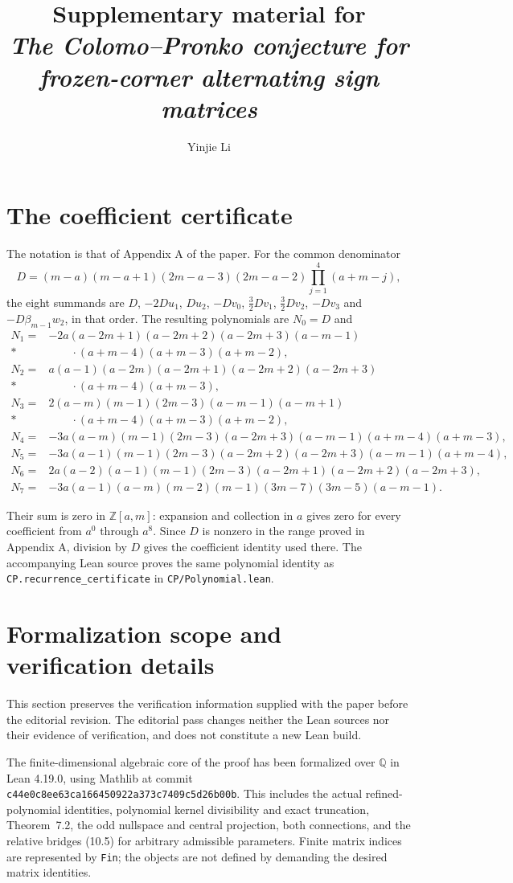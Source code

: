 \documentclass[11pt,a4paper]{article}
\title{Supplementary material for\\\emph{The Colomo--Pronko conjecture for frozen-corner alternating sign matrices}}
\author{Yinjie Li}
\date{}
\newcommand{\Q}{\mathbb Q}
\begin{document}
\maketitle
\section{The coefficient certificate}
The notation is that of Appendix A of the paper. For the common denominator
\[
 D=(m-a)(m-a+1)(2m-a-3)(2m-a-2)\prod_{j=1}^4(a+m-j),
\]
the eight summands are $D$, $-2Du_1$, $Du_2$, $-Dv_0$, $\tfrac32Dv_1$, $\tfrac32Dv_2$, $-Dv_3$ and $-D\beta_{m-1}w_2$, in that order.
The resulting polynomials are $N_0=D$ and
\begin{align*}
 N_1={}&-2a(a-2m+1)(a-2m+2)(a-2m+3)(a-m-1)\\*
 &\qquad\cdot(a+m-4)(a+m-3)(a+m-2),\\
 N_2={}&a(a-1)(a-2m)(a-2m+1)(a-2m+2)(a-2m+3)\\*
 &\qquad\cdot(a+m-4)(a+m-3),\\
 N_3={}&2(a-m)(m-1)(2m-3)(a-m-1)(a-m+1)\\*
 &\qquad\cdot(a+m-4)(a+m-3)(a+m-2),\\
 N_4={}&-3a(a-m)(m-1)(2m-3)(a-2m+3)(a-m-1)(a+m-4)(a+m-3),\\
 N_5={}&-3a(a-1)(m-1)(2m-3)(a-2m+2)(a-2m+3)(a-m-1)(a+m-4),\\
 N_6={}&2a(a-2)(a-1)(m-1)(2m-3)(a-2m+1)(a-2m+2)(a-2m+3),\\
 N_7={}&-3a(a-1)(a-m)(m-2)(m-1)(3m-7)(3m-5)(a-m-1).
\end{align*}

Their sum is zero in $\mathbb Z[a,m]$: expansion and collection in $a$ gives zero for every coefficient from $a^0$ through $a^8$. Since $D$ is nonzero in the range proved in Appendix A, division by $D$ gives the coefficient identity used there. The accompanying Lean source proves the same polynomial identity as \texttt{CP.recurrence\_certificate} in \texttt{CP/Polynomial.lean}.

\section{Formalization scope and verification details}
This section preserves the verification information supplied with the paper before the editorial revision. The editorial pass changes neither the Lean sources nor their evidence of verification, and does not constitute a new Lean build.

The finite-dimensional algebraic core of the proof has been formalized over $\Q$ in Lean 4.19.0, using Mathlib at commit
\texttt{c44e0c8ee63ca166450922a373c7409c5d26b00b}. This includes the actual refined-polynomial identities, polynomial kernel divisibility and exact truncation, Theorem~7.2, the odd nullspace and central projection, both connections, and the relative bridges (10.5) for arbitrary admissible parameters. Finite matrix indices are represented by \texttt{Fin}; the objects are not defined by demanding the desired matrix identities.
\end{document}
